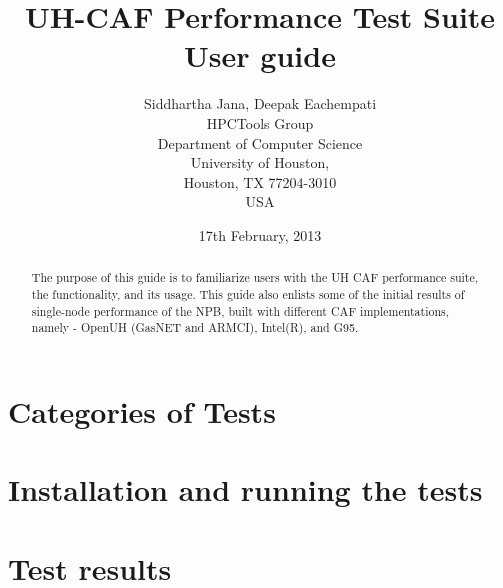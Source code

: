 \documentclass[12pt]{article}
\title{UH-CAF Performance Test Suite User guide}
\author{Siddhartha Jana, Deepak Eachempati\\
HPCTools Group \\
Department of Computer Science\\
University of Houston, \\
Houston, TX 77204-3010 \\
USA\\
}
\date{17th February, 2013}
\begin{document}
\maketitle

\begin{abstract}
The purpose of this guide is to familiarize users with the UH CAF performance suite, the functionality, and its usage. This guide also enlists some of the initial results of single-node performance of the NPB, built with different CAF implementations, namely - OpenUH (GasNET and ARMCI), Intel(R), and G95.
\end{abstract}

\section{Categories of Tests}


\section{Installation and running the tests}


\section{Test results}


%
%
\end{document}
